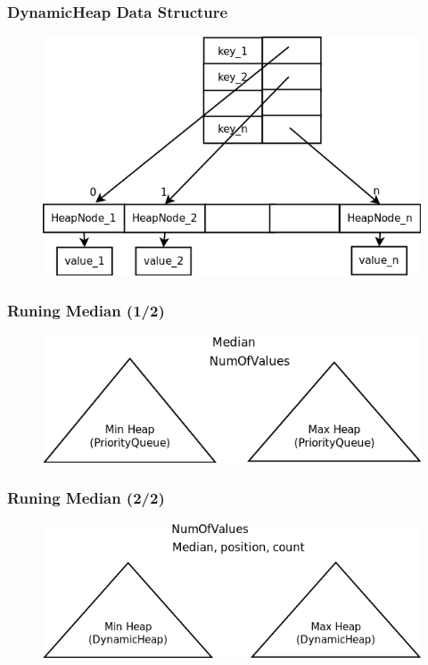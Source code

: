 \documentclass{beamer}
\begin{document}
\begin{frame}
\frametitle{DynamicHeap Data Structure}

\begin{figure}
        \includegraphics[width=0.7\linewidth]{DinamicHeap.png}
\end{figure}

\end{frame}

\begin{frame}
\frametitle{Runing Median (1/2)}

\begin{figure}
        \includegraphics[width=0.8\linewidth]{runningmediang.png}
\end{figure}

\end{frame}


\begin{frame}
\frametitle{Runing Median (2/2)}

\begin{figure}
        \includegraphics[width=0.8\linewidth]{runningmediand.png}
\end{figure}

\end{frame}
\end{document}
